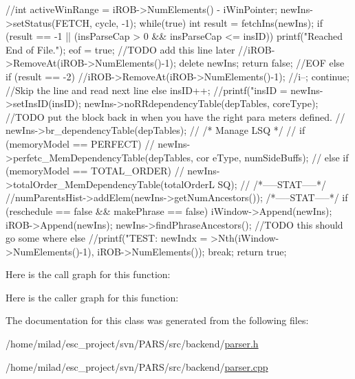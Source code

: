 \begin{DoxyCode}
                                         {
        //int activeWinRange = iROB->NumElements() - iWinPointer;
        newIns->setStatus(FETCH, cycle, -1);
        while(true) {
                int result = fetchIns(newIns);
                if (result == -1 || (insParseCap > 0 && insParseCap <= insID)) {
                        printf("Reached End of File.\n");
                        eof = true; //TODO add this line later
                        //iROB->RemoveAt(iROB->NumElements()-1);
                        delete newIns;
                        return false;
                } //EOF
                else if (result == -2) {
                        //iROB->RemoveAt(iROB->NumElements()-1);
                        //i--;
                        continue; //Skip the line and read next line
                } else {
                        insID++;
                        //printf("insID = %
                        newIns->setInsID(insID);
                        newIns->noRRdependencyTable(depTables, coreType);
                        //TODO put the block back in when you have the right para
      meters defined.
                        // newIns->br_dependencyTable(depTables);
                        // /* Manage LSQ */ 
                        // if (memoryModel == PERFECT) {
                        //      newIns->perfetc_MemDependencyTable(depTables, cor
      eType, numSideBuffs);
                        // } else if (memoryModel == TOTAL_ORDER) {
                        //      newIns->totalOrder_MemDependencyTable(totalOrderL
      SQ);
                        // }
                        /*-----STAT-----*/
                        //numParentsHist->addElem(newIns->getNumAncestors());
                        /*-----STAT-----*/
                        if (reschedule == false && makePhrase == false)
                                iWindow->Append(newIns);
                        iROB->Append(newIns);
                        newIns->findPhraseAncestors(); //TODO this should go some
      where else
                        //printf("TEST: newIndx = %
      >Nth(iWindow->NumElements()-1), iROB->NumElements());
                        break;
                }
        }
        return true;
}
\end{DoxyCode}


Here is the call graph for this function:




Here is the caller graph for this function:




The documentation for this class was generated from the following files:\begin{DoxyCompactItemize}
\item 
/home/milad/esc\_\-project/svn/PARS/src/backend/\hyperlink{parser_8h}{parser.h}\item 
/home/milad/esc\_\-project/svn/PARS/src/backend/\hyperlink{backend_2parser_8cpp}{parser.cpp}\end{DoxyCompactItemize}
